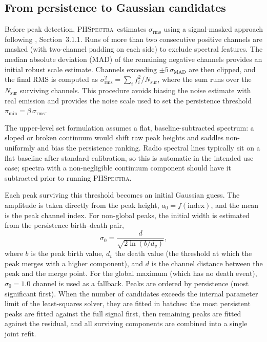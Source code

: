 \documentclass[twocolumn,twocolappendix,aj]{aastex631}
\newcommand{\phspectra}{\textsc{PHSpectra}}
\newcommand{\srms}{\sigma_{\mathrm{rms}}}
\newcommand{\pmin}{\pi_{\mathrm{min}}}
\begin{document}
\subsection{From persistence to Gaussian candidates}\label{sec:candidates}

Before peak detection, \phspectra\ estimates $\srms$ using a signal-masked
approach following \citet{Riener2019}, Section~3.1.1.  Runs of more than two
consecutive positive channels are masked (with two-channel padding on each
side) to exclude spectral features.  The median absolute deviation (MAD) of
the remaining negative channels provides an initial robust scale estimate.
Channels exceeding $\pm 5\,\sigma_{\mathrm{MAD}}$ are then clipped, and the
final RMS is computed as $\srms^2 = \sum_i f_i^2/N_{\mathrm{sur}}$, where the sum
runs over the $N_{\mathrm{sur}}$ surviving channels.  This procedure avoids biasing the noise estimate with
real emission and provides the noise scale used to set the persistence
threshold $\pmin = \beta\,\srms$.

The upper-level set formulation assumes a flat, baseline-subtracted
spectrum: a sloped or broken continuum would shift raw peak heights and
saddles non-uniformly and bias the persistence ranking.  Radio spectral
lines typically sit on a flat baseline after standard calibration, so this
is automatic in the intended use case; spectra with a non-negligible
continuum component should have it subtracted prior to running \phspectra.

Each peak surviving this threshold becomes an initial Gaussian guess.  The
amplitude is taken directly from the peak height, $a_0 = f(\mathrm{index})$,
and the mean is the peak channel index.  For non-global peaks, the initial
width is estimated from the persistence birth--death pair,
\begin{equation}\label{eq:sigma0}
  \sigma_0 = \frac{d}{\sqrt{2\ln(b / d_v)}},
\end{equation}
where $b$ is the peak birth value, $d_v$ the death value (the threshold at
which the peak merges with a higher component), and $d$ is the channel
distance between the peak and the merge point.  For the global maximum (which
has no death event), $\sigma_0 = 1.0$ channel is used as a fallback.  Peaks
are ordered by persistence (most significant first).  When the number of
candidates exceeds the internal parameter limit of the least-squares solver,
they are fitted in batches: the most persistent peaks are fitted against the
full signal first, then remaining peaks are fitted against the residual, and
all surviving components are combined into a single joint refit.
\end{document}
